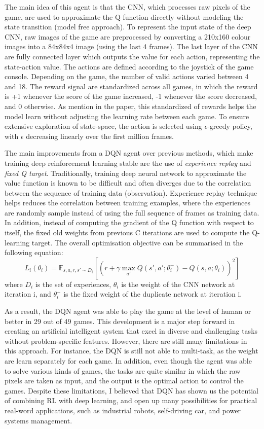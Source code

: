 \documentclass[12pt,letterpaper]{article}
\begin{document}
The main idea of this agent is that the CNN, which processes raw pixels of the game, are used to approximate the Q function directly
 without modeling the state transition (model free approach). 
To represent the input state of the deep CNN, raw images of the game are preprocessed 
by converting a 210x160 colour images into a 84x84x4 image (using the last 4 frames).
The last layer of the CNN are fully connected layer which outputs the value for each action, representing the state-action value.
The actions are defined according to the joystick of the game console.
Depending on the game, the number of valid actions varied between 4 and 18.
The reward signal are standardized across all games, in which the reward is +1 whenever the score of the game increased,
 -1 whenever the score decreased, and 0 otherwise. 
 As mention in the paper, this standardized of rewards helps the model learn without adjusting the learning rate between each game.
To ensure extensive exploration of state-space, the action is selected using $\epsilon$-greedy policy, with $\epsilon$ decreasing linearly over the first million frames.

The main improvements from a DQN agent over previous methods, which make training deep reinforcement learning stable are the use of \textit{experience replay} and \textit{fixed Q target}.
Traditionally, training deep neural network to approximate the value function is known to be difficult and often diverges
due to the correlation between the sequence of training data (observation).
Experience replay technique helps reduces the correlation between training examples, 
where the experiences are randomly sample instead of using the full sequence of frames as training data.
In addition, instead of computing the gradient of the Q function with respect to itself, 
the fixed old weights from previous C iterations are used to compute the Q-learning target. 
The overall optimisation objective can be summarised in the following equation: 
\begin{equation}
L_i(\theta_i) = \mathbb{E}_{s,a,r,s'\sim D_i} [(r + \gamma \max_{a'}Q(s',a';\theta^{-}_{i}) - Q(s,a;\theta_i))^2]
\end{equation}
where $D_i$ is the set of experiences, $\theta_i$ is the weight of the CNN network at iteration i, 
and $\theta^-_i$ is the fixed weight of the duplicate network at iteration i.

As a result, the DQN agent was able to play the game at the level of human or better in 29 out of 49 games.
This development is a major step forward in creating an artificial intelligent system that excel in diverse and challenging tasks without problem-specific features. 
However, there are still many limitations in this approach.
For instance, the DQN is still not able to multi-task, as the weight are learn separately for each game. 
In addition, even though the agent was able to solve various kinds of games, the tasks are quite similar in which the raw pixels are taken as input, 
and the output is the optimal action to control the games.
Despite these limitations, I believed that DQN has shown us the potential of combining RL with deep learning, 
and open up many possibilities for practical real-word applications, such as industrial robots, self-driving car, and power systems management.
\end{document}
